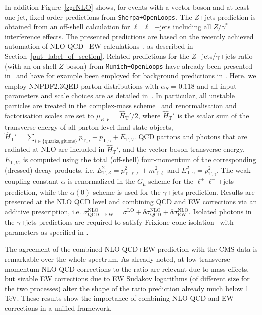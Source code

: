 \documentclass[11pt]{cernrep} \usepackage{graphicx,epsfig} 
\begin{document}
In addition Figure~\ref{zgrNLO} shows, for events with a vector boson and at least one
jet, fixed-order predictions from {\tt Sherpa+OpenLoops}. The $Z$+jets prediction
is obtained from an off-shell calculation for $\ell^+\ell^-$+jets including all $Z/\gamma^*$ interference effects.
The presented predictions are based on the recently 
achieved automation of NLO QCD+EW 
calculations~\cite{Kallweit:2014xda,Kallweit:2015dum}, as described in 
Section~\ref{put_label_of_section}. Related predictions for the $Z$+jets/$\gamma$+jets 
ratio (with an on-shell $Z$ boson) from {\tt Munich+OpenLoops} have already been presented 
in~\cite{Kallweit:2015fta} and have for example been employed for background 
predictions in \cite{CMS:2015jdt}. Here, we employ NNPDF2.3QED \cite{Ball:2013hta} 
parton distributions with $\alpha_S=0.118$ and all input parameters and scale 
choices are as detailed in~\cite{Kallweit:2015dum}. In particular, all unstable 
particles are treated in the complex-mass scheme~\cite{Denner:2005fg} and  
renormalisation and factorisation scales are set to 
$\mu_{R,F}=\hat{H}_{\mathrm{T}}'/2$, where $\hat{H}_{\mathrm{T}}'$ is the scalar 
sum of the transverse energy of all parton-level final-state objects, 
$\hat{H}_{\mathrm{T}}' = \sum_{i\in \{\mathrm{quarks,gluons}\}} p_{\mathrm{T},i} 
+ p_{\mathrm{T},\gamma} + E_{\mathrm{T}, V}$. QCD partons and photons that are 
radiated at NLO are included in $\hat{H}_{\mathrm{T}}'$, and the vector-boson 
transverse energy, $E_{\mathrm{T},V}$,  is computed using the total (off-shell) 
four-momentum of the corresponding (dressed) decay products, i.e. 
$E^2_{\mathrm{T},Z}=p^2_{\mathrm{T},\ell\ell}+m_{\ell\ell}^2$ and 
$E^2_{\mathrm{T},\gamma}=p_{\mathrm{T},\gamma}^2$. The weak coupling constant 
$\alpha$ is renormalized in the $G_{\mu}$ scheme for the $\ell^+\ell^-$+jets prediction, 
while the $\alpha(0)$-scheme is used for the $\gamma$+jets prediction. Results 
are presented at the NLO QCD level and combining QCD and EW corrections via an 
additive prescription, i.e. $\sigma^{\mathrm{NLO}}_{\mathrm{QCD+EW}} =
\sigma^{\mathrm{LO}}+\delta\sigma^{\mathrm{NLO}}_{\mathrm{QCD}} + 
\delta\sigma^{\mathrm{NLO}}_{\mathrm{EW}}$. Isolated photons in the $\gamma$+jets 
predictions are required to satisfy Frixione cone isolation~\cite{Frixione} with parameters
as specified in \cite{Khachatryan:2015ira}.

The agreement of the combined NLO QCD+EW prediction with the CMS data is
remarkable over the whole spectrum. As already noted, at low transverse momentum
NLO QCD corrections to the ratio are relevant due to mass effects, but sizable
EW corrections due to EW Sudakov logarithms (of different size for the two
processes) alter the shape of the ratio prediction already much below 1 TeV.
These results show the importance of combining NLO QCD and EW corrections in a
unified framework.



\end{document}
